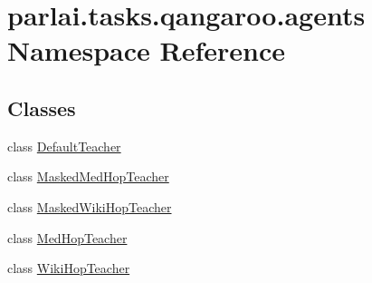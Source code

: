 \hypertarget{namespaceparlai_1_1tasks_1_1qangaroo_1_1agents}{}\section{parlai.\+tasks.\+qangaroo.\+agents Namespace Reference}
\label{namespaceparlai_1_1tasks_1_1qangaroo_1_1agents}
\subsection*{Classes}
\begin{DoxyCompactItemize}
\item 
class \hyperlink{classparlai_1_1tasks_1_1qangaroo_1_1agents_1_1DefaultTeacher}{Default\+Teacher}
\item 
class \hyperlink{classparlai_1_1tasks_1_1qangaroo_1_1agents_1_1MaskedMedHopTeacher}{Masked\+Med\+Hop\+Teacher}
\item 
class \hyperlink{classparlai_1_1tasks_1_1qangaroo_1_1agents_1_1MaskedWikiHopTeacher}{Masked\+Wiki\+Hop\+Teacher}
\item 
class \hyperlink{classparlai_1_1tasks_1_1qangaroo_1_1agents_1_1MedHopTeacher}{Med\+Hop\+Teacher}
\item 
class \hyperlink{classparlai_1_1tasks_1_1qangaroo_1_1agents_1_1WikiHopTeacher}{Wiki\+Hop\+Teacher}
\end{DoxyCompactItemize}
